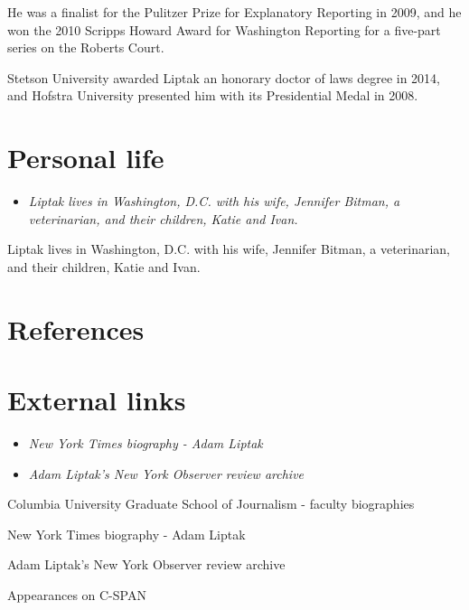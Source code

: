 He was a finalist for the Pulitzer Prize for Explanatory Reporting in
2009, and he won the 2010 Scripps Howard Award for Washington Reporting
for a five-part series on the Roberts Court.

Stetson University awarded Liptak an honorary doctor of laws degree in
2014, and Hofstra University presented him with its Presidential Medal
in 2008.

\section{Personal life}\label{personal-life}

\begin{itemize}
\item
  \emph{Liptak lives in Washington, D.C. with his wife, Jennifer Bitman,
  a veterinarian, and their children, Katie and Ivan.}
\end{itemize}

Liptak lives in Washington, D.C. with his wife, Jennifer Bitman, a
veterinarian, and their children, Katie and Ivan.

\section{References}\label{references}

\section{External links}\label{external-links}

\begin{itemize}
\item
  \emph{New York Times biography - Adam Liptak}
\item
  \emph{Adam Liptak's New York Observer review archive}
\end{itemize}

Columbia University Graduate School of Journalism - faculty biographies

New York Times biography - Adam Liptak

Adam Liptak's New York Observer review archive

Appearances on C-SPAN
